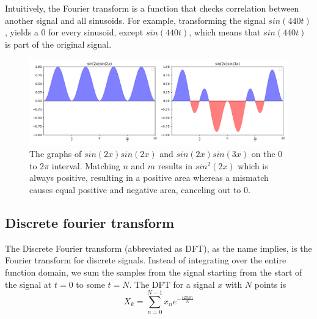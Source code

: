 Intuitively, the Fourier transform is a function that checks correlation between another signal and all sinusoids. For example, transforming the signal $sin(440t)$, yields a 0 for every sinusoid, except $sin(440t)$, which means that $sin(440t)$ is part of the original signal.

\begin{figure}[ht]
    \centering
    \includegraphics[width=\textwidth]{./images/transformIdea.png}
    \caption{The graphs of $sin(2x)sin(2x)$ and $sin(2x)sin(3x)$ on the $0$ to $2\pi$ interval. Matching $n$ and $m$ results in $sin^2(2x)$ which is always positive, resulting in a positive area whereas a mismatch causes equal positive and negative area, canceling out to 0.\label{fig:transformIdea}}
\end{figure}

\subsection{Discrete fourier transform} 
The Discrete Fourier transform (abbreviated as DFT), as the name implies, is the Fourier transform for discrete signals. Instead of integrating over the entire function domain, we sum the samples from the signal starting from the start of the signal at $t=0$ to some $t=N$. The DFT for a signal $x$ with $N$ points is 
$$X_k = \sum_{n=0}^{N-1} x_ne^{-\frac{i2\pi kn}{N}}$$

